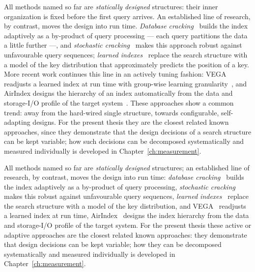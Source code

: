 \begin{nurlang}
All methods named so far are \emph{statically designed} structures: their inner organization is fixed
before the first query arrives. An established line of research, by contrast, moves the design into run
time\@. \emph{Database cracking}~\cite{idreos2007cracking} builds the index adaptively as a by-product
of query processing --- each query partitions the data a little further ---, and \emph{stochastic
cracking}~\cite{halim2012stochastic} makes this approach robust against unfavourable query sequences;
\emph{learned indexes}~\cite{kraska2018learned} replace the search structure with a model of the key
distribution that approximately predicts the position of a key. More recent work continues this line in
an actively tuning fashion: VEGA readjusts a learned index at run time with group-wise learning
granularity~\cite{li2025vega}, and AirIndex designs the hierarchy of an index automatically from the
data and storage-I/O profile of the target system~\cite{chockchowwat2023airindex}. These approaches show
a common trend:
away from the hard-wired single structure, towards configurable, self-adapting designs. For the present
thesis they are the closest related known approaches, since they demonstrate that the design decisions
of a search structure can be kept variable; how such decisions can be decomposed systematically and
measured individually is developed in Chapter~\ref{ch:measurement}.
\end{nurlang}
\begin{nurkurz}
All methods named so far are \emph{statically designed} structures; an established line of research, by
contrast, moves the design into run time: \emph{database cracking}~\cite{idreos2007cracking} builds the index
adaptively as a by-product of query processing, \emph{stochastic cracking}~\cite{halim2012stochastic} makes
this robust against unfavourable query sequences, \emph{learned indexes}~\cite{kraska2018learned} replace the
search structure with a model of the key distribution, and VEGA~\cite{li2025vega} readjusts a learned index at
run time, AirIndex~\cite{chockchowwat2023airindex} designs the index hierarchy from the data and storage-I/O
profile of the target system. For the present thesis these active or adaptive approaches are the closest
related known approaches: they demonstrate that design decisions can be kept variable; how they can be
decomposed systematically and measured individually is developed in Chapter~\ref{ch:measurement}.
\end{nurkurz}

